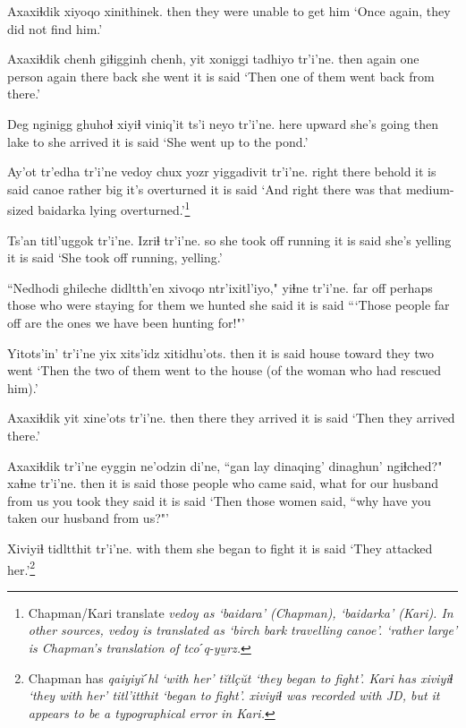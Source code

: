 \documentclass[12pt]{article}
\begin{document}
\gll Axaxiɬdik {xiyoqo xinithinek.}
then  {they were unable to get him}
\glt `Once again, they did not find him.'
\glend

\gll Axaxiɬdik chenh  giɬigginh chenh, yit xoniggi tadhiyo tr'i'ne.
then  again {one person} again there back {she went} {it is said}
\glt `Then one of them went back from there.'
\glend

\gll Deg nginigg ghuhoɬ xiyiɬ viniq'it ts'i neyo  tr'i'ne.
here upward {she's going} then lake to {she arrived} {it is said}
\glt `She went up to the pond.'
\glend

\gll Ay'ot  tr'edha tr'i'ne vedoy  {chux yozr} yiggadivit tr'i'ne.
{right there} behold  {it is said} canoe {rather big} {it's overturned} {it is said}
\glt `And right there was that medium-sized baidarka lying overturned.'\footnote{Chapman/Kari translate \em vedoy \em as `baidara' (Chapman), `baidarka' (Kari). In other sources, \em vedoy \em is translated as `birch bark travelling canoe'. `rather large' is Chapman's translation of \em tcoˊq-y\b{u}rz.}
\glend

\gll Ts'an titl'uggok  tr'i'ne. Izriɬ  tr'i'ne.
so {she took off running} {it is said} {she's yelling} {it is said}
\glt `She took off running, yelling.'
\glend

\gll ``Nedhodi ghileche didltth'en  xivoqo ntr'ixitl'iyo," yiɬne  tr'i'ne.
{far off} perhaps {those who were staying} {for them} {we hunted} {she said} {it is said}
\glt ```Those people far off are the ones we have been hunting for!"'
\glend

\gll Yitots'in' tr'i'ne yix xits'idz xitidhu'ots.
then  {it is said} house toward {they two went}
\glt `Then the two of them went to the house (of the woman who had rescued him).'
\glend

\gll Axaxiɬdik yit xine'ots tr'i'ne.
then  there {they arrived} {it is said}
\glt `Then they arrived there.'
\glend

\gll Axaxiɬdik tr'i'ne eyggin ne'odzin di'ne, ``gan lay dinaqing' dinaghun' ngiɬched?" xaɬne  tr'i'ne.
then  {it is said} {those people} {who came} said, what for {our husband} {from us} {you took} {they said} {it is said}
\glt `Then those women said, ``why have you taken our husband from us?"'
\glend

\gll Xiviyiɬ tidltthit  tr'i'ne.
{with them} {she began to fight} {it is said}
\glt `They attacked her.'\footnote{Chapman has \em qaiyiy\u{i}ˊhl \em `with her' \em t\u{i}tl\c{c}\u{u}t \em `they began to fight'. Kari has \em xiviyiɬ \em `they with her' \em titl'itthit \em `began to fight'. \em xiviyiɬ \em was recorded with JD, but it appears to be a typographical error in Kari.} 
\glend
\end{document}
